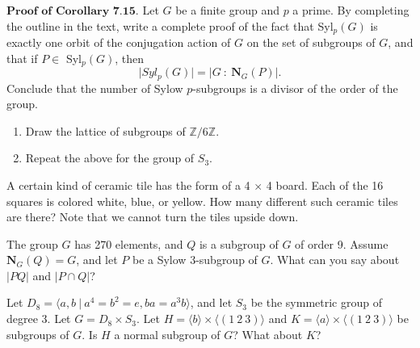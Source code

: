 \documentclass[12pt,letterpaper,boxed]{hmcpset}
\begin{document}

\begin{problem}[7.3.3]
$ \textbf{Proof of Corollary 7.15.} $ Let $G$ be a finite group and $p$ a prime. By completing the outline in the text, write a complete proof of the fact that Syl$_p(G)$ is exactly one orbit of the conjugation action of $G$ on the set of subgroups of $G$, and that if $P \in$ Syl$_p(G)$, then $$\vert Syl_p(G) \vert = \vert G \ : \ \textbf{N}_G(P) \vert. $$ Conclude that the number of Sylow $p$-subgroups is a divisor of the order of the group. 
\end{problem}

\begin{solution}

\end{solution}

\clearpage

\begin{problem}[9.1.3]
\begin{enumerate}[label=\alph*]
\item Draw the lattice of subgroups of $ \mathbb{Z}/6\mathbb{Z} $.
\item Repeat the above for the group of $S_3$.
\end{enumerate}
\end{problem}

\clearpage


\begin{problem}[8.2.7]
A certain kind of ceramic tile has the form of a 4 $\times$ 4 board. Each of the 16 squares is colored white, blue, or yellow. How many different such ceramic tiles are there? Note that we cannot turn the tiles upside down. 
\end{problem}

\begin{solution}
\end{solution}

\clearpage

\begin{problem}[9.2.6]
The group $G$ has 270 elements, and $Q$ is a subgroup of $G$ of order 9.  Assume $\textbf{N}_G(Q) = G$, and let $P$ be a Sylow 3-subgroup of $G$. What can you say about $\vert PQ \vert$ and $\vert P \cap Q \vert$?
\end{problem}

\begin{solution}

\end{solution}

\clearpage

\begin{problem}[10.1.2]
Let $ D_8 = \langle a,b \ \vert \ a^4 = b^2 = e, ba = a^3b \rangle $, and let $S_3$ be the symmetric group of degree 3. Let $ G = D_8 \times S_3 $. Let $ H = \langle b \rangle \times \langle (1 \ 2 \ 3) \rangle $ and $ K = \langle a \rangle \times \langle (1 \ 2 \ 3) \rangle $ be subgroups of $G$. Is $H$ a normal subgroup of $G$? What about $K$?
\end{problem}

\begin{solution}
\end{solution}
\end{document}
